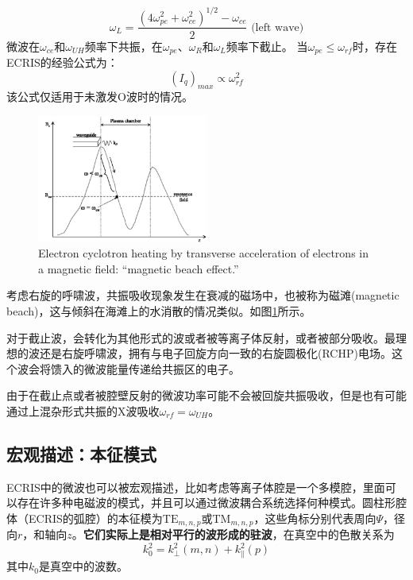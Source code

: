 \documentclass[fontset=windows]{article}
\begin{document}
\begin{enumerate}
\begin{enumerate}
\begin{equation}
        \end{equation}
        \begin{equation}
            \omega_L=\frac{(4\omega_{pe}^2+\omega_{ce}^2)^{1/2}-\omega_{ce}}{2}\text{  (left wave)}
        \end{equation}
        微波在$\omega_{ce}$和$\omega_{UH}$频率下共振，在$\omega_{pe}$、$\omega_{R}$和$\omega_{L}$频率下截止。
        当$\omega_{pe}\le\omega_{rf}$时，存在ECRIS的经验公式为：
        \begin{equation}
            (I_q)_{max}\propto\omega_{rf}^2
        \end{equation}
        该公式仅适用于未激发O波时的情况。
    \end{enumerate}
\end{enumerate}
\begin{figure}
    \centering
    \includegraphics[width=0.5\textwidth]{magnetic beach effect.png}
    \caption{Electron cyclotron heating by transverse acceleration of electrons in a magnetic field: “magnetic beach effect.”}
    \label{f-1}
\end{figure}

考虑右旋的呼啸波，共振吸收现象发生在衰减的磁场中，也被称为磁滩(magnetic beach)，这与倾斜在海滩上的水消散的情况类似。如图\ref{f-1}所示。

对于截止波，会转化为其他形式的波或者被等离子体反射，或者被部分吸收。最理想的波还是右旋呼啸波，拥有与电子回旋方向一致的右旋圆极化(RCHP)电场。这个波会将馈入的微波能量传递给共振区的电子。

由于在截止点或者被腔壁反射的微波功率可能不会被回旋共振吸收，但是也有可能通过上混杂形式共振的X波吸收$\omega_{rf}=\omega_{UH}$。

\subsection{宏观描述：本征模式}
ECRIS中的微波也可以被宏观描述，比如考虑等离子体腔是一个多模腔，里面可以存在许多种电磁波的模式，并且可以通过微波耦合系统选择何种模式。圆柱形腔体（ECRIS的弧腔）的本征模为$\text{TE}_{m,n,p}$或$\text{TM}_{m,n,p}$，这些角标分别代表周向$\Psi$，径向$r$，和轴向$z$。\textbf{它们实际上是相对平行的波形成的驻波}，在真空中的色散关系为
\begin{equation}
    k_0^2=k_\perp^2(m,n)+k_\parallel^2(p)
\end{equation}
其中$k_0$是真空中的波数。
\end{document}
